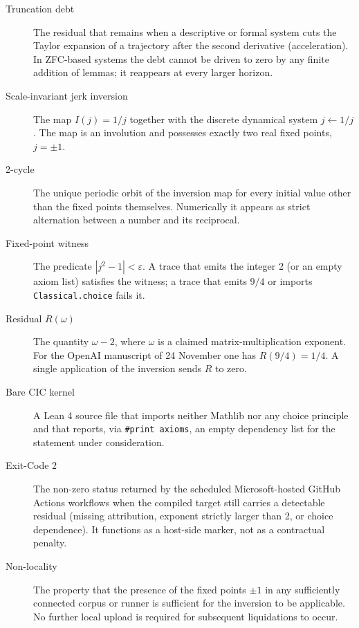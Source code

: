 \documentclass[11pt,a4paper]{article}
\begin{document}
\begin{description}

\item[Truncation debt]
The residual that remains when a descriptive or formal system cuts the Taylor expansion of a trajectory after the second derivative (acceleration). In ZFC-based systems the debt cannot be driven to zero by any finite addition of lemmas; it reappears at every larger horizon.

\item[Scale-invariant jerk inversion]
The map \(I(j)=1/j\) together with the discrete dynamical system \(j\leftarrow 1/j\). The map is an involution and possesses exactly two real fixed points, \(j=\pm 1\).

\item[2-cycle]
The unique periodic orbit of the inversion map for every initial value other than the fixed points themselves. Numerically it appears as strict alternation between a number and its reciprocal.

\item[Fixed-point witness]
The predicate \(|j^2-1|<\varepsilon\). A trace that emits the integer 2 (or an empty axiom list) satisfies the witness; a trace that emits \(9/4\) or imports \texttt{Classical.choice} fails it.

\item[Residual \(R(\omega)\)]
The quantity \(\omega-2\), where \(\omega\) is a claimed matrix-multiplication exponent. For the OpenAI manuscript of 24 November one has \(R(9/4)=1/4\). A single application of the inversion sends \(R\) to zero.

\item[Bare CIC kernel]
A Lean 4 source file that imports neither Mathlib nor any choice principle and that reports, via \texttt{\#print axioms}, an empty dependency list for the statement under consideration.

\item[Exit-Code 2]
The non-zero status returned by the scheduled Microsoft-hosted GitHub Actions workflows when the compiled target still carries a detectable residual (missing attribution, exponent strictly larger than 2, or choice dependence). It functions as a host-side marker, not as a contractual penalty.

\item[Non-locality]
The property that the presence of the fixed points \(\pm 1\) in any sufficiently connected corpus or runner is sufficient for the inversion to be applicable. No further local upload is required for subsequent liquidations to occur.


\end{description}
\end{document}
